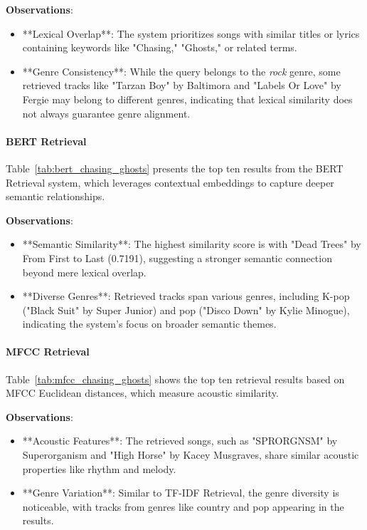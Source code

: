 \documentclass[sigconf]{acmart}
\begin{document}
\textbf{Observations}:
\begin{itemize}
    \item **Lexical Overlap**: The system prioritizes songs with similar titles or lyrics containing keywords like "Chasing," "Ghosts," or related terms.
    \item **Genre Consistency**: While the query belongs to the \textit{rock} genre, some retrieved tracks like "Tarzan Boy" by Baltimora and "Labels Or Love" by Fergie may belong to different genres, indicating that lexical similarity does not always guarantee genre alignment.
\end{itemize}

\paragraph{BERT Retrieval}

Table~\ref{tab:bert_chasing_ghosts} presents the top ten results from the BERT Retrieval system, which leverages contextual embeddings to capture deeper semantic relationships.

\textbf{Observations}:
\begin{itemize}
    \item **Semantic Similarity**: The highest similarity score is with "Dead Trees" by From First to Last (0.7191), suggesting a stronger semantic connection beyond mere lexical overlap.
    \item **Diverse Genres**: Retrieved tracks span various genres, including K-pop ("Black Suit" by Super Junior) and pop ("Disco Down" by Kylie Minogue), indicating the system's focus on broader semantic themes.
\end{itemize}

\paragraph{MFCC Retrieval}

Table~\ref{tab:mfcc_chasing_ghosts} shows the top ten retrieval results based on MFCC Euclidean distances, which measure acoustic similarity.

\textbf{Observations}:
\begin{itemize}
    \item **Acoustic Features**: The retrieved songs, such as "SPRORGNSM" by Superorganism and "High Horse" by Kacey Musgraves, share similar acoustic properties like rhythm and melody.
    \item **Genre Variation**: Similar to TF-IDF Retrieval, the genre diversity is noticeable, with tracks from genres like country and pop appearing in the results.
\end{itemize}
\end{document}
